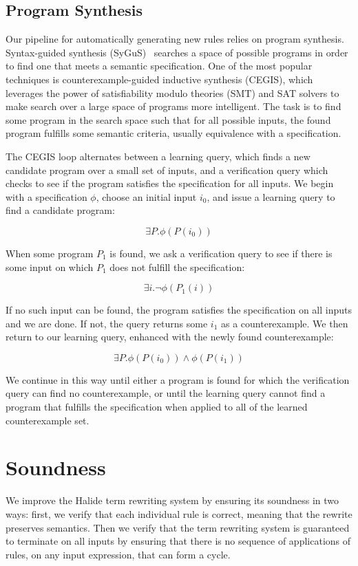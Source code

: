 \documentclass[acmsmall,review,anonymous]{acmart}\settopmatter{printfolios=true,printccs=false,printacmref=false}
\begin{document}
\subsection{Program Synthesis}
Our pipeline for automatically generating new rules relies on program synthesis.
Syntax-guided synthesis (SyGuS)~\cite{sygus} searches a space of possible programs in order to find one that meets
a semantic specification.  One of the most popular techniques is counterexample-guided
inductive synthesis (CEGIS), which leverages the power of satisfiability modulo theories
(SMT) and SAT solvers to make search over a large space of programs more intelligent.
The task is to find some program in the search space such that for all possible
inputs, the found program fulfills some semantic criteria, usually equivalence with
a specification.

The CEGIS loop alternates between a learning query, which finds a new candidate program over a small set of inputs, and a verification query which checks to see if the program satisfies the specification for all inputs. We begin with a specification $\phi$, choose an initial input $i_0$, and issue a learning query to find a candidate program:

$$\exists P . \phi(P(i_0))$$

When some program $P_1$ is found, we ask a verification query to see if there is some input on which $P_1$ does not fulfill the specification:

$$\exists i . \neg \phi(P_1(i))$$

If no such input can be found, the program satisfies the specification on all inputs and we are done. If not, the query returns some $i_1$ as a counterexample. We then return to our learning query, enhanced with the newly found counterexample:

$$\exists P . \phi(P(i_0)) \wedge \phi(P(i_1))$$

We continue in this way until either a program is found for which the verification query can find no counterexample, or until the learning query cannot find a program that fulfills the specification when applied to all of the learned counterexample set.

\section{Soundness}
\label{sec:soundness}

We improve the Halide term rewriting system by ensuring its soundness in
two ways: first, we verify that each individual rule is correct, meaning that the
rewrite preserves semantics. Then we verify that the term rewriting system is
guaranteed to terminate on all inputs by ensuring that there is no sequence of
applications of rules, on any input expression, that can form a cycle.
\end{document}
